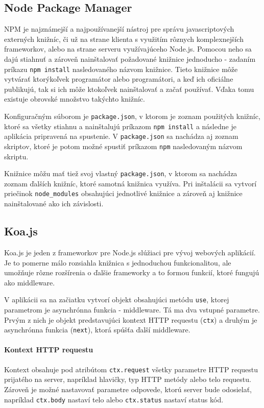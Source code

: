 \documentclass[
  digital, %
  table,   %
  lof,     %
  lot,     %
]{fithesis3}
\begin{document}
\subsection{Node Package Manager}
NPM je najznámejší a najpoužívanejší nástroj pre správu javascriptových externých knižníc, či už na strane klienta s využitím rôznych komplexnejších frameworkov, alebo na strane serveru využívajúceho Node.js. Pomocou neho sa dajú stiahnuť a zároveň nainštalovať požadované knižnice jednoducho - zadaním príkazu \texttt{npm install} nasledovaného názvom knižnice. Tieto knižnice môže vytvárať ktorýkoľvek programátor alebo programátori, a keď ich oficiálne publikujú, tak si ich môže ktokoľvek nainštalovať a začať používať. Vďaka tomu existuje obrovské množstvo takýchto knižníc.

Konfiguračným súborom je \texttt{package.json}, v ktorom je zoznam použitých knižníc, ktoré sa všetky stiahnu a nainštalujú príkazom \texttt{npm install} a následne je aplikácia pripravená na spustenie. V \texttt{package.json} sa nachádza aj zoznam skriptov, ktoré je potom možné spustiť príkazom \texttt{npm} nasledovaným názvom skriptu.

Knižnice môžu mať tiež svoj vlastný \texttt{package.json}, v ktorom sa nachádza zoznam ďalších knižníc, ktoré samotná knižnica využíva. Pri inštalácii sa vytvorí priečinok \texttt{node\_modules} obsahujúci jednotlivé knižnice a zároveň aj knižnice nainštalované ako ich závislosti.

\subsection{Koa.js}
Koa.js je jeden z frameworkov pre Node.js slúžiaci pre vývoj webových aplikácií. Je to pomerne málo rozsiahla knižnica s jednoduchou funkcionalitou, ale umožňuje rôzne rozšírenia o ďalšie frameworky a to formou funkcií, ktoré fungujú ako middleware. 

V aplikácii sa na začiatku vytvorí objekt obsahujúci metódu \texttt{use}, ktorej parametrom je asynchrónna funkcia - middleware. Tá ma dva vstupné parametre. Prvým z nich je objekt predstavujúci kontext HTTP requestu (\texttt{ctx}) a druhým je asynchrónna funkcia (\texttt{next}), ktorá spúšťa ďalší middleware.

\paragraph{Kontext HTTP requestu}
Kontext obsahuje pod atribútom \texttt{ctx.request} všetky parametre HTTP requestu prijatého na server, napríklad hlavičky, typ HTTP metódy alebo telo requestu. Zároveň je možné nastavovať parametre odpovede, ktorú server bude odosielať, napríklad \texttt{ctx.body} nastaví telo alebo \texttt{ctx.status} nastaví status kód.
\end{document}
